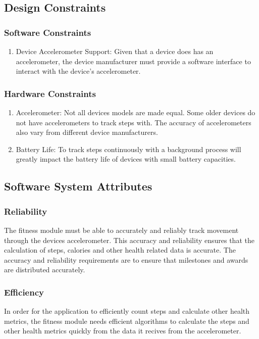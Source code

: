 \subsection{Design Constraints}

\subsubsection{Software Constraints}
\begin{enumerate}
	\item Device Accelerometer Support:
	\newline
	Given that a device does has an accelerometer, the device manufacturer must provide a software interface to interact with the device's accelerometer.
\end{enumerate}

\subsubsection{Hardware Constraints}
\begin{enumerate}
	\item Accelerometer:
	\newline
	Not all devices models are made equal. Some older devices do not have accelerometers to track steps with. The accuracy of accelerometers also vary from different device manufacturers.
	\item Battery Life:
	\newline
	To track steps continuously with a background process will greatly impact the battery life of devices with small battery capacities. 
\end{enumerate}

\subsection{Software System Attributes} 
\subsubsection{Reliability} 
The fitness module must be able to accurately and reliably track movement through the devices accelerometer. This accuracy and reliability ensures that the calculation of steps, calories and other health related data is accurate. The accuracy and reliability requirements are to ensure that milestones and awards are distributed accurately.    

\subsubsection{Efficiency} 
In order for the application to efficiently count steps and calculate other health metrics, the fitness module needs efficient algorithms to calculate the steps and other health metrics quickly from the data it recives from the accelerometer.  

